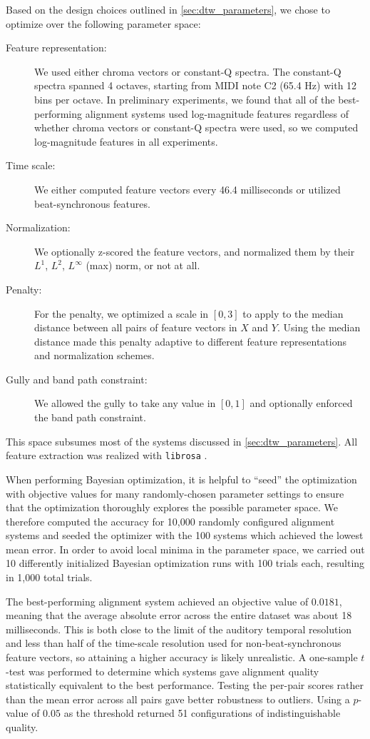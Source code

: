 Based on the design choices outlined in \cref{sec:dtw_parameters}, we chose to optimize over the following parameter space:
\begin{description}
\item[Feature representation:] We used either chroma vectors or constant-Q spectra.
The constant-Q spectra spanned 4 octaves, starting from MIDI note C2 (65.4 Hz) with 12 bins per octave.
In preliminary experiments, we found that all of the best-performing alignment systems used log-magnitude features regardless of whether chroma vectors or constant-Q spectra were used, so we computed log-magnitude features in all experiments.
\item[Time scale:] We either computed feature vectors every 46.4 milliseconds or utilized beat-synchronous features.
\item[Normalization:] We optionally z-scored the feature vectors, and normalized them by their $L^1$, $L^2$, $L^\infty$ (max) norm, or not at all.
\item[Penalty:] For the penalty, we optimized a scale in $[0, 3]$ to apply to the median distance between all pairs of feature vectors in $X$ and $Y$.
Using the median distance made this penalty adaptive to different feature representations and normalization schemes.
\item[Gully and band path constraint:] We allowed the gully to take any value in $[0, 1]$ and optionally enforced the band path constraint.
\end{description}
This space subsumes most of the systems discussed in \cref{sec:dtw_parameters}.
All feature extraction was realized with \texttt{librosa} \cite{mcfee2015librosa, mcfee2015librosa_scipy}.

When performing Bayesian optimization, it is helpful to ``seed'' the optimization with objective values for many randomly-chosen parameter settings to ensure that the optimization thoroughly explores the possible parameter space.
We therefore computed the accuracy for 10,000 randomly configured alignment systems and seeded the optimizer with the 100 systems which achieved the lowest mean error.
In order to avoid local minima in the parameter space, we carried out 10 differently initialized Bayesian optimization runs with 100 trials each, resulting in 1,000 total trials.

The best-performing alignment system achieved an objective value of $0.0181$, meaning that the average absolute error across the entire dataset was about 18 milliseconds.
This is both close to the limit of the auditory temporal resolution and less than half of the time-scale resolution used for non-beat-synchronous feature vectors, so attaining a higher accuracy is likely unrealistic.
A one-sample $t$-test was performed to determine which systems gave alignment quality statistically equivalent to the best performance.
Testing the per-pair scores rather than the mean error across all pairs gave better robustness to outliers.
Using a $p$-value of $0.05$ as the threshold returned 51 configurations of indistinguishable quality.

